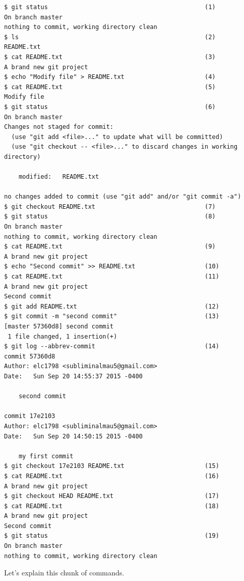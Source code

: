 \documentclass[11pt,fleqn]{article}
\theoremstyle{definition}
\begin{document}
\begin{verbatim}
$ git status                                           (1)
On branch master
nothing to commit, working directory clean
$ ls                                                   (2)
README.txt
$ cat README.txt                                       (3)
A brand new git project
$ echo "Modify file" > README.txt                      (4)
$ cat README.txt                                       (5)
Modify file
$ git status                                           (6)
On branch master
Changes not staged for commit:
  (use "git add <file>..." to update what will be committed)
  (use "git checkout -- <file>..." to discard changes in working directory)

	modified:   README.txt

no changes added to commit (use "git add" and/or "git commit -a")
$ git checkout README.txt                              (7)
$ git status                                           (8)
On branch master
nothing to commit, working directory clean
$ cat README.txt                                       (9)
A brand new git project
$ echo "Second commit" >> README.txt                   (10) 
$ cat README.txt                                       (11)
A brand new git project
Second commit
$ git add README.txt                                   (12)
$ git commit -m "second commit"                        (13)
[master 57360d8] second commit
 1 file changed, 1 insertion(+)
$ git log --abbrev-commit                              (14)
commit 57360d8
Author: elc1798 <subliminalmau5@gmail.com>
Date:   Sun Sep 20 14:55:37 2015 -0400

    second commit

commit 17e2103
Author: elc1798 <subliminalmau5@gmail.com>
Date:   Sun Sep 20 14:50:15 2015 -0400

    my first commit
$ git checkout 17e2103 README.txt                      (15)
$ cat README.txt                                       (16) 
A brand new git project
$ git checkout HEAD README.txt                         (17)
$ cat README.txt                                       (18)
A brand new git project
Second commit
$ git status                                           (19)
On branch master
nothing to commit, working directory clean
\end{verbatim}

Let's explain this chunk of commands.
\end{document}
